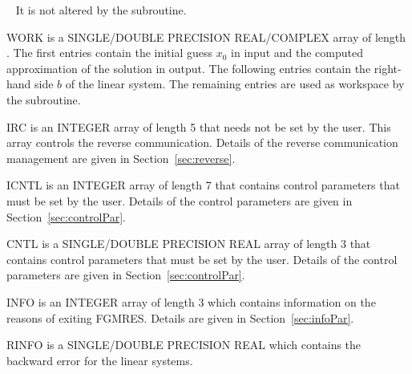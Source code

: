 \begin{listparam}
 \item[~]       It is not altered by the subroutine.
 \item[WORK]    is a SINGLE/DOUBLE PRECISION REAL/COMPLEX array of length
                .
                The first  entries contain the initial guess
                $x_0$ in input and the computed approximation of the
                solution in output.
                The following  entries
                contain the right-hand side $b$ of the linear
                system. The remaining entries are
                used as workspace by the subroutine.
  \item[IRC]    is an INTEGER array of length 5 that needs not be set by the
                user.
                This array controls the reverse communication. Details of
                the reverse communication management are given in
                Section~\ref{sec:reverse}.
  \item[ICNTL]  is an INTEGER array of length 7 that contains control
                parameters that must be set by the user. Details of the
                control parameters are given in Section~\ref{sec:controlPar}.
  \item[CNTL]   is a SINGLE/DOUBLE PRECISION REAL array of length 3 that
                contains control parameters that must be set by the user.
                Details of the control parameters are given in
                Section~\ref{sec:controlPar}.
  \item[INFO]   is an INTEGER array of length 3 which contains information on
                the reasons of exiting FGMRES. Details are given in
                Section~\ref{sec:infoPar}.
  \item[RINFO]  is a SINGLE/DOUBLE PRECISION REAL which
                contains the backward error for the
                linear systems.
\end{listparam}

